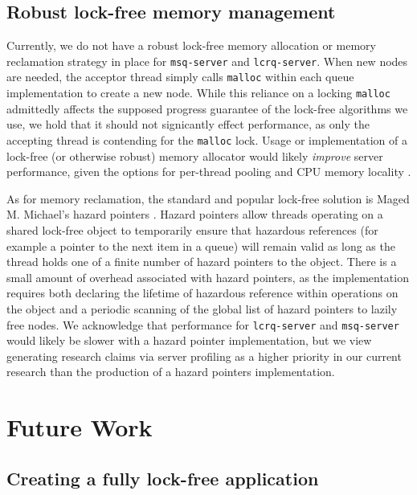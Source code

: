 \documentclass[twoside,10pt]{article}
\begin{document}
\begin{multicols}{2}
\subsection{Robust lock-free memory management}

Currently, we do not have a robust lock-free memory allocation or
memory reclamation strategy in place for \verb+msq-server+ and
\verb+lcrq-server+. When new nodes are needed, the acceptor thread
simply calls \verb+malloc+ within each queue implementation to create
a new node. While this reliance on a locking \verb+malloc+ admittedly
affects the supposed progress guarantee of the lock-free algorithms we
use, we hold that it should not signicantly effect performance, as
only the accepting thread is contending for the \verb+malloc+
lock. Usage or implementation of a lock-free (or otherwise robust)
memory allocator would likely \emph{improve} server performance, given the
options for per-thread pooling and CPU memory locality
\cite{hart2007performance}.

As for memory reclamation, the standard and popular lock-free solution
is Maged M. Michael's hazard pointers \cite{michael2004hazard}. Hazard
pointers allow threads operating on a shared lock-free object to
temporarily ensure that hazardous references (for example a pointer to
the next item in a queue) will remain valid as long as the thread
holds one of a finite number of hazard pointers to the object. There
is a small amount of overhead associated with hazard pointers, as the
implementation requires both declaring the lifetime of hazardous
reference within operations on the object and a periodic scanning of
the global list of hazard pointers to lazily free nodes. We
acknowledge that performance for \verb+lcrq-server+ and
\verb+msq-server+ would likely be slower with a hazard pointer
implementation, but we view generating research claims via server
profiling as a higher priority in our current research than the
production of a hazard pointers implementation.

\section{Future Work}

\subsection{Creating a fully lock-free application}


\end{multicols}
\end{document}
